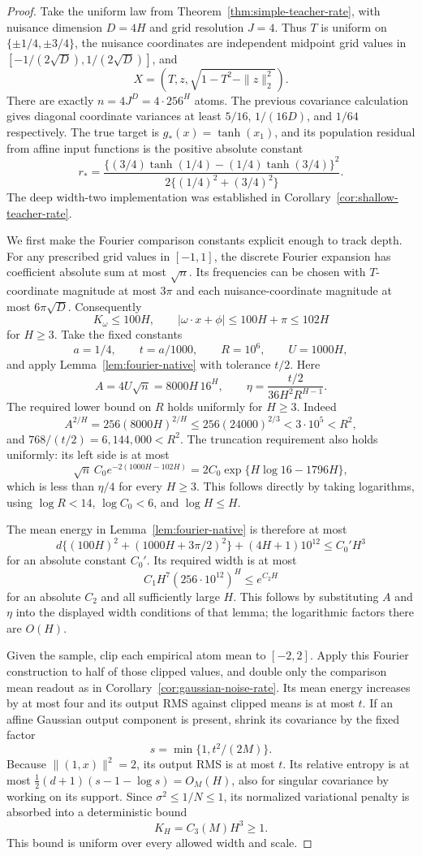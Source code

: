 \begin{proof}
Take the uniform law from Theorem~\ref{thm:simple-teacher-rate}, with nuisance dimension $D=4H$ and grid resolution $J=4$. Thus $T$ is uniform on $\{\pm1/4,\pm3/4\}$, the nuisance coordinates are independent midpoint grid values in $[-1/(2\sqrt D),1/(2\sqrt D)]$, and
\[
 X=(T,z,\sqrt{1-T^2-\|z\|_2^2}).
\]
There are exactly $n=4J^D=4\cdot256^H$ atoms. The previous covariance calculation gives diagonal coordinate variances at least $5/16$, $1/(16D)$, and $1/64$ respectively. The true target is $g_*(x)=\tanh(x_1)$, and its population residual from affine input functions is the positive absolute constant
\[
 r_* =\frac{\{(3/4)\tanh(1/4)-(1/4)\tanh(3/4)\}^2}
                  {2\{(1/4)^2+(3/4)^2\}}.
\]
The deep width-two implementation was established in Corollary~\ref{cor:shallow-teacher-rate}.

We first make the Fourier comparison constants explicit enough to track depth. For any prescribed grid values in $[-1,1]$, the discrete Fourier expansion has coefficient absolute sum at most $\sqrt n$. Its frequencies can be chosen with $T$-coordinate magnitude at most $3\pi$ and each nuisance-coordinate magnitude at most $6\pi\sqrt D$. Consequently
\[
 K_\omega\le100H,\qquad
 |\omega\cdot x+\phi|\le100H+\pi\le102H
\]
for $H\ge3$. Take the fixed constants
\[
 a=1/4,\qquad t=a/1000,\qquad
 R=10^6,\qquad U=1000H,
\]
and apply Lemma~\ref{lem:fourier-native} with tolerance $t/2$. Here
\[
 A=4U\sqrt n=8000H\,16^H,\qquad
 \eta=\frac{t/2}{36H^2R^{H-1}}.
\]
The required lower bound on $R$ holds uniformly for $H\ge3$. Indeed
\[
 A^{2/H}=256(8000H)^{2/H}
 \le256(24000)^{2/3}<3\cdot10^5<R^2,
\]
and $768/(t/2)=6{,}144{,}000<R^2$.
The truncation requirement also holds uniformly: its left side is at most
\[
 \sqrt n\,C_0e^{-2(1000H-102H)}
       =2C_0\exp\{H\log16-1796H\},
\]
which is less than $\eta/4$ for every $H\ge3$. This follows directly by taking logarithms, using $\log R<14$, $\log C_0<6$, and $\log H\le H$.

The mean energy in Lemma~\ref{lem:fourier-native} is therefore at most
\[
 d\{(100H)^2+(1000H+3\pi/2)^2\}+(4H+1)10^{12}
 \le C_0' H^3
\]
for an absolute constant $C_0'$. Its required width is at most
\[
 C_1 H^7(256\cdot10^{12})^H\le e^{C_2H}
\]
for an absolute $C_2$ and all sufficiently large $H$. This follows by substituting $A$ and $\eta$ into the displayed width conditions of that lemma; the logarithmic factors there are $O(H)$.

Given the sample, clip each empirical atom mean to $[-2,2]$. Apply this Fourier construction to half of those clipped values, and double only the comparison mean readout as in Corollary~\ref{cor:gaussian-noise-rate}. Its mean energy increases by at most four and its output RMS against clipped means is at most $t$. If an affine Gaussian output component is present, shrink its covariance by the fixed factor
\[
 s=\min\{1,t^2/(2M)\}.
\]
Because $\|(1,x)\|^2=2$, its output RMS is at most $t$. Its relative entropy is at most
$\tfrac12(d+1)(s-1-\log s)=O_M(H)$, also for singular covariance by working on its support. Since $\sigma^2\le1/N\le1$, its normalized variational penalty is absorbed into a deterministic bound
\[
 K_H=C_3(M)H^3\ge1.
\]
This bound is uniform over every allowed width and scale.


\end{proof}
